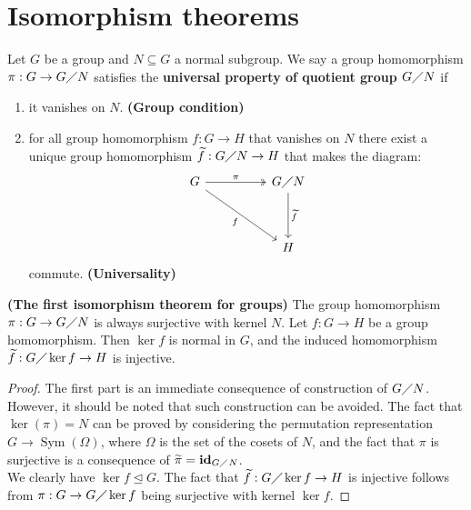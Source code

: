 \documentclass{report}
\begin{document}
\section{Isomorphism theorems}
 Let $G$ be a group and $N\subseteq  G$ a normal subgroup. We say a group homomorphism $ \pi :G \rightarrow   G\diagup N$ satisfies the \textbf{universal property of quotient group $G\diagup N$} if 
\begin{enumerate}[label=(\roman*)]
  \item it vanishes on $N$. \textbf{(Group condition)}
  \item for all group homomorphism $f:G\rightarrow H$ that vanishes on $N$ there exist a unique group homomorphism $\widetilde{f} :G\diagup N\rightarrow H$ that makes the diagram: 
\[\begin{tikzcd}
	G && {G\quotient N } \\
	\\
	&& H 
	\arrow["\pi",two heads, from=1-1, to=1-3]
	\arrow["f"', from=1-1, to=3-3]
	\arrow["\tilde{f} ", from=1-3, to=3-3]
\end{tikzcd}\]
commute. \textbf{(Universality)}
\end{enumerate}
\begin{theorem}
\textbf{(The first isomorphism theorem for groups)} The group homomorphism $\pi : G \rightarrow G \diagup N$ is always surjective with kernel $N$. Let $f :G \rightarrow H$ be a group homomorphism. Then $\operatorname{ker}f$ is normal in $G$, and the induced homomorphism $\widetilde{f}: G \diagup \operatorname{ker}f \rightarrow H$ is injective.   
\end{theorem}
\begin{proof}
The first part is an immediate consequence of construction of $G \diagup N$. However, it should be noted that such construction can be avoided. The fact that $\operatorname{ker}(\pi )=N$ can be proved by considering the permutation representation $G \rightarrow \operatorname{Sym}(\Omega)$, where $\Omega$ is the set of the cosets of $N$, and the fact that  $\pi $ is surjective is a consequence of $\widetilde{\pi }=\text{\textbf{id}}_{G\diagup N}$. \\

We clearly have $\operatorname{ker}f \trianglelefteq G$. The fact that $\widetilde{f}:G \diagup \operatorname{ker}f \rightarrow H$ is injective follows from $\pi : G \rightarrow G \diagup \operatorname{ker}f$ being surjective with kernel $\operatorname{ker}f$. 
\end{proof}
\end{document}
